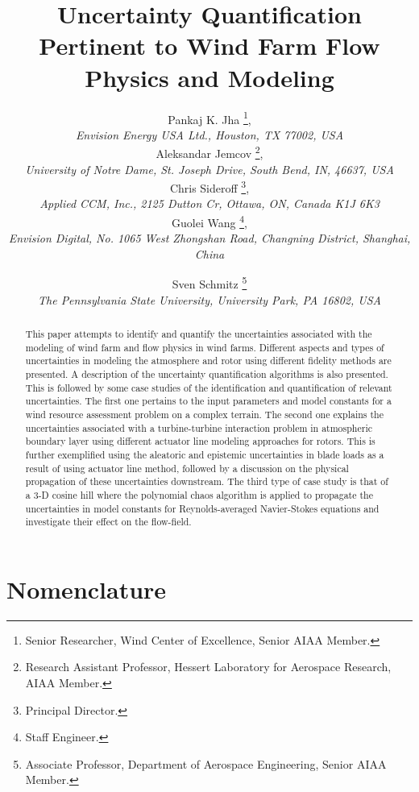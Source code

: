 \documentclass[]{aiaa-tc}%
\title{Uncertainty Quantification Pertinent to Wind Farm Flow Physics and Modeling}
\author{
    Pankaj K. Jha%
    \thanks{Senior Researcher, Wind Center of Excellence, Senior AIAA Member.},\\
   {\normalsize\itshape
   Envision Energy USA Ltd., Houston, TX 77002, USA}\\
    Aleksandar Jemcov%
    \thanks{Research Assistant Professor, Hessert Laboratory for Aerospace Research, AIAA Member.},\\
   {\normalsize\itshape
   University of Notre Dame, St. Joseph Drive, South Bend, IN, 46637, USA}\\
    Chris Sideroff%
    \thanks{Principal Director.},\\
   {\normalsize\itshape
   Applied CCM, Inc., 2125 Dutton Cr, Ottawa, ON, Canada K1J 6K3}\\
 Guolei Wang%
   \thanks{Staff Engineer.},\\
  {\normalsize\itshape
   Envision Digital, No. 1065 West Zhongshan Road, Changning District, Shanghai, China}\\
  \and
  Sven Schmitz %
   \thanks{Associate Professor, Department of Aerospace Engineering, Senior AIAA Member.}\\
  {\normalsize\itshape
  The Pennsylvania State University, University Park, PA 16802, USA}
 }
\begin{document}
\maketitle

\begin{abstract}
This paper attempts to identify and quantify the uncertainties associated with the modeling of wind farm and flow physics in wind farms. Different aspects and types of uncertainties in modeling the atmosphere and rotor using different fidelity methods are presented. A description of the uncertainty quantification algorithms is also presented. This is followed by some case studies of the identification and quantification of relevant uncertainties. The first one pertains to the input parameters and model constants for a wind resource assessment problem on a complex terrain. The second one explains the uncertainties associated with a turbine-turbine interaction problem in atmospheric boundary layer using different actuator line modeling approaches for rotors. This is further exemplified using the aleatoric and epistemic uncertainties in blade loads as a result of using actuator line method, followed by a discussion on the physical propagation of these uncertainties downstream. The third type of case study is that of a 3-D cosine hill where the polynomial chaos algorithm is applied to propagate the uncertainties in model constants for Reynolds-averaged Navier-Stokes equations and investigate their effect on the flow-field.    
\end{abstract}

\section*{Nomenclature}
\end{document}
